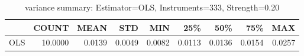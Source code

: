 \begin{table}[ht]
\centering
\caption{variance summary: Estimator=OLS, Instruments=333, Strength=0.20}
\begin{tabular}{lrrrrrrrr}
\toprule
 & COUNT & MEAN & STD & MIN & 25\% & 50\% & 75\% & MAX \\
\midrule
OLS & 10.0000 & 0.0139 & 0.0049 & 0.0082 & 0.0113 & 0.0136 & 0.0154 & 0.0257 \\
\bottomrule
\end{tabular}
\end{table}
